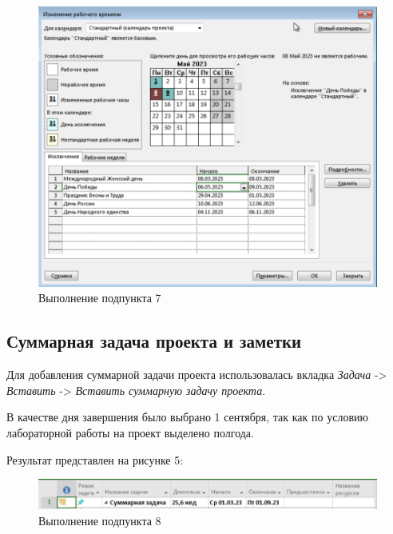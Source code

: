 \FloatBarrier
\begin{figure}[h]	
	\begin{center}
		\includegraphics[width=\linewidth]{inc/1-7.png}
	\end{center}
	\captionsetup{justification=centering}
	\caption{Выполнение подпункта 7}
\end{figure}
\FloatBarrier

\subsection*{Суммарная задача проекта и заметки}
Для добавления суммарной задачи проекта использовалась вкладка \textit{Задача} -> \textit{Вставить} -> \textit{Вставить суммарную задачу проекта}.

В качестве дня завершения было выбрано 1 сентября, так как по условию лабораторной работы на проект выделено полгода.

Результат представлен на рисунке 5:
\FloatBarrier
\begin{figure}[h]	
	\begin{center}
		\includegraphics[width=\linewidth]{inc/1-81.png}
	\end{center}
	\captionsetup{justification=centering}
	\caption{Выполнение подпункта 8}
\end{figure}
\FloatBarrier

